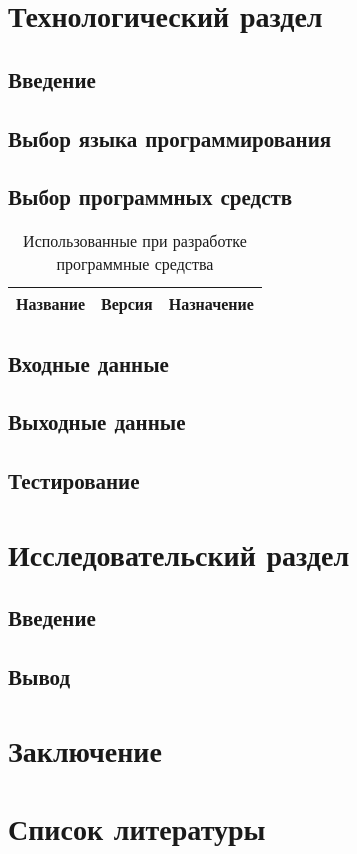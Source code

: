 \section{Технологический раздел}
\subsection{Введение}
\subsection{Выбор языка программирования}
\subsection{Выбор программных средств}

\begin{table}[h]
    \caption{Использованные при разработке программные средства}
    \centering
    \begin{tabu}{|>{\centering}p{3.5cm}|>{\centering}p{2.3cm}|X[c]|}
    	\hline
    	Название                         & Версия           & 
    	Назначение                                                \\ \hline
    	\hline
    \end{tabu}
    \label{tab:software}
\end{table}

\subsection{Входные данные}

\subsection{Выходные данные}

\subsection{Тестирование}

\section{Исследовательский раздел}
\subsection{Введение}

\subsection{Вывод}

\section{Заключение}

\section{Список литературы}
\nocite{datasetList, rgbdBenchmark, msds}
\printbibliography[heading=none]



